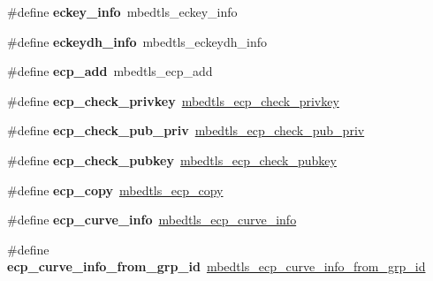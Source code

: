 \begin{DoxyCompactItemize}
\mbox{\label{compat-1_83_8h_a059105244e0fe117c1d0d766316c77d0}} 
\#define {\bfseries eckey\+\_\+info}~mbedtls\+\_\+eckey\+\_\+info
\item 
\mbox{\label{compat-1_83_8h_af314b15757b8873a04140131b10bff2c}} 
\#define {\bfseries eckeydh\+\_\+info}~mbedtls\+\_\+eckeydh\+\_\+info
\item 
\mbox{\label{compat-1_83_8h_aaf65505bb377657d210672d3f6d57795}} 
\#define {\bfseries ecp\+\_\+add}~mbedtls\+\_\+ecp\+\_\+add
\item 
\mbox{\label{compat-1_83_8h_a89535c11fa0b06760215628ccafc08d9}} 
\#define {\bfseries ecp\+\_\+check\+\_\+privkey}~\mbox{\hyperlink{ecp_8h_a5eefe5e5381076f95dbc8c6779f4da4e}{mbedtls\+\_\+ecp\+\_\+check\+\_\+privkey}}
\item 
\mbox{\label{compat-1_83_8h_ac5d1704477d3813275c81e9f9e6b59ce}} 
\#define {\bfseries ecp\+\_\+check\+\_\+pub\+\_\+priv}~\mbox{\hyperlink{ecp_8h_a5718c919b1ad1bf86ce4d45613f06e55}{mbedtls\+\_\+ecp\+\_\+check\+\_\+pub\+\_\+priv}}
\item 
\mbox{\label{compat-1_83_8h_af2e06abdb03d22b0cdf3faf600ba472c}} 
\#define {\bfseries ecp\+\_\+check\+\_\+pubkey}~\mbox{\hyperlink{ecp_8h_ae8768744c65fc71137b496f10cc02370}{mbedtls\+\_\+ecp\+\_\+check\+\_\+pubkey}}
\item 
\mbox{\label{compat-1_83_8h_a0ea7a216bb21c7c5348261f8374a463e}} 
\#define {\bfseries ecp\+\_\+copy}~\mbox{\hyperlink{ecp_8h_a97cfab220125dd40d96344e441656142}{mbedtls\+\_\+ecp\+\_\+copy}}
\item 
\mbox{\label{compat-1_83_8h_ad32e7b2fedec9d5f3588afe875516d00}} 
\#define {\bfseries ecp\+\_\+curve\+\_\+info}~\mbox{\hyperlink{structmbedtls__ecp__curve__info}{mbedtls\+\_\+ecp\+\_\+curve\+\_\+info}}
\item 
\mbox{\label{compat-1_83_8h_a34701ab3d08b5a1f81cd3bd3cf7e499a}} 
\#define {\bfseries ecp\+\_\+curve\+\_\+info\+\_\+from\+\_\+grp\+\_\+id}~\mbox{\hyperlink{ecp_8h_a6234c72d1af65d804da31a2706ef522e}{mbedtls\+\_\+ecp\+\_\+curve\+\_\+info\+\_\+from\+\_\+grp\+\_\+id}}

\end{DoxyCompactItemize}
